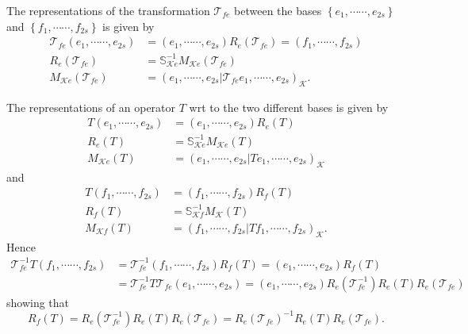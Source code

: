\documentclass[aps,preprint]{revtex4}%
\begin{document}
The representations of the transformation $\mathcal{T}_{fe}$ between the bases
$\left\{  e_{1},\cdots\cdots,e_{2s}\right\}  $ and $\left\{  f_{1}%
,\cdots\cdots,f_{2s}\right\}  $ is given by
\begin{align}
\mathcal{T}_{fe}\left(  e_{1},\cdots\cdots,e_{2s}\right)   &  =\left(
e_{1},\cdots\cdots,e_{2s}\right)  R_{e}\left(  \mathcal{T}_{fe}\right)
=\left(  f_{1},\cdots\cdots,f_{2s}\right) \\
R_{e}\left(  \mathcal{T}_{fe}\right)   &  =\mathbb{S}_{\mathcal{K}e}%
^{-1}M_{\mathcal{K}e}\left(  \mathcal{T}_{fe}\right) \\
M_{\mathcal{K}e}\left(  \mathcal{T}_{fe}\right)   &  =\left(  e_{1}%
,\cdots\cdots,e_{2s}\left\vert \mathcal{T}_{fe}e_{1},\cdots\cdots
,e_{2s}\right.  \right)  _{\mathcal{K}}.
\end{align}


The representations of an operator $T$ wrt to the two different bases is given
by
\begin{align}
T\left(  e_{1},\cdots\cdots,e_{2s}\right)   &  =\left(  e_{1},\cdots
\cdots,e_{2s}\right)  R_{e}\left(  T\right) \\
R_{e}\left(  T\right)   &  =\mathbb{S}_{\mathcal{K}e}^{-1}M_{\mathcal{K}%
e}\left(  T\right) \\
M_{\mathcal{K}e}\left(  T\right)   &  =\left(  e_{1},\cdots\cdots
,e_{2s}\left\vert Te_{1},\cdots\cdots,e_{2s}\right.  \right)  _{\mathcal{K}}%
\end{align}
and%
\begin{align}
T\left(  f_{1},\cdots\cdots,f_{2s}\right)   &  =\left(  f_{1},\cdots
\cdots,f_{2s}\right)  R_{f}\left(  T\right) \\
R_{f}\left(  T\right)   &  =\mathbb{S}_{\mathcal{K}f}^{-1}M_{\mathcal{K}%
}\left(  T\right) \\
M_{\mathcal{K}f}\left(  T\right)   &  =\left(  f_{1},\cdots\cdots
,f_{2s}\left\vert Tf_{1},\cdots\cdots,f_{2s}\right.  \right)  _{\mathcal{K}}.
\end{align}
Hence
\begin{align}
\mathcal{T}_{fe}^{-1}T\left(  f_{1},\cdots\cdots,f_{2s}\right)   &
=\mathcal{T}_{fe}^{-1}\left(  f_{1},\cdots\cdots,f_{2s}\right)  R_{f}\left(
T\right)  =\left(  e_{1},\cdots\cdots,e_{2s}\right)  R_{f}\left(  T\right) \\
&  =\mathcal{T}_{fe}^{-1}T\mathcal{T}_{fe}\left(  e_{1},\cdots\cdots
,e_{2s}\right)  =\left(  e_{1},\cdots\cdots,e_{2s}\right)  R_{e}\left(
\mathcal{T}_{fe}^{-1}\right)  R_{e}\left(  T\right)  R_{e}\left(
\mathcal{T}_{fe}\right)
\end{align}
showing that
\begin{equation}
R_{f}\left(  T\right)  =R_{e}\left(  \mathcal{T}_{fe}^{-1}\right)
R_{e}\left(  T\right)  R_{e}\left(  \mathcal{T}_{fe}\right)  =R_{e}\left(
\mathcal{T}_{fe}\right)  ^{-1}R_{e}\left(  T\right)  R_{e}\left(
\mathcal{T}_{fe}\right)  .
\end{equation}
\end{document}
